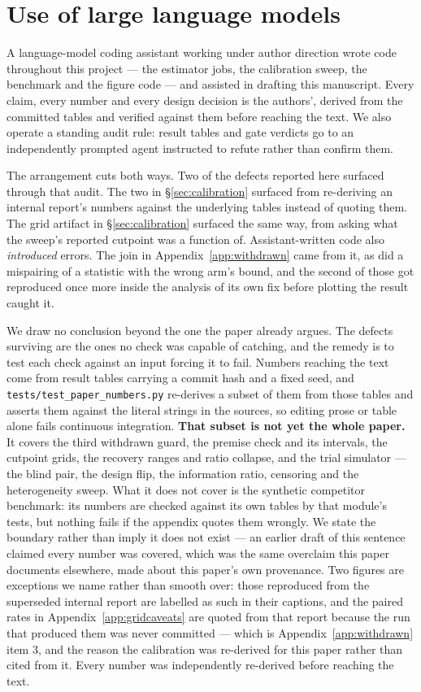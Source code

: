 \section{Use of large language models}
\label{app:llm}


A language-model coding assistant working under author direction wrote code
throughout this project --- the estimator jobs, the calibration sweep, the
benchmark and the figure code --- and assisted in drafting this manuscript.
Every claim, every number and every design decision is the authors', derived
from the committed tables and verified against them before reaching the text.
We also operate a standing audit rule: result tables and gate verdicts go to an
independently prompted agent instructed to refute rather than confirm them.

The arrangement cuts both ways. Two of the defects reported here surfaced through
that audit. The two in \S\ref{sec:calibration} surfaced from re-deriving an
internal report's numbers against the underlying tables instead of quoting them.
The grid artifact in \S\ref{sec:calibration} surfaced the same way, from asking
what the sweep's reported cutpoint was a function of. Assistant-written code also
\emph{introduced} errors. The join in Appendix~\ref{app:withdrawn} came from it,
as did a mispairing of a statistic with the wrong arm's bound, and the second of
those got reproduced once more inside the analysis of its own fix before plotting
the result caught it.

We draw no conclusion beyond the one the paper already argues. The defects
surviving are the ones no check was capable of catching, and the remedy is to
test each check against an input forcing it to fail. 
Numbers reaching the text come from result tables carrying a commit hash and a
fixed seed, and \texttt{tests/test\_paper\_numbers.py} re-derives a subset of
them from those tables and asserts them against the literal strings in the
sources, so editing prose or table alone fails continuous integration. \textbf{That
subset is not yet the whole paper.} It covers the third withdrawn guard, the
premise check and its intervals, the cutpoint grids, the recovery ranges and
ratio collapse, and the trial simulator --- the blind pair, the design flip, the
information ratio, censoring and the heterogeneity sweep. What it does not cover
is the synthetic competitor benchmark: its numbers are checked against its own
tables by that module's tests, but nothing fails if the appendix quotes them
wrongly. We state the boundary
rather than imply it does not exist --- an earlier draft of this sentence
claimed every number was covered, which was the same overclaim this paper
documents elsewhere, made about this paper's own provenance. Two figures are
exceptions we name rather than smooth over: those reproduced
from the superseded internal report are labelled as such in their captions, and
the paired rates in Appendix~\ref{app:gridcaveats} are quoted from that
report because the run that produced them was never committed --- which is
Appendix~\ref{app:withdrawn} item 3, and the reason the calibration was re-derived
for this paper rather than cited from it. Every number was independently
re-derived before reaching the text.

